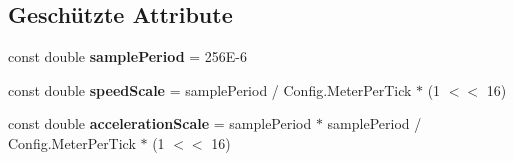 \subsection*{Geschützte Attribute}
\begin{DoxyCompactItemize}
\item 
\hypertarget{class_robot_ctrl_1_1_motor_ctrl___h_w_a9b2e8f281c704b73014ed11f838dfab5}{
const double {\bfseries samplePeriod} = 256E-\/6}
\label{class_robot_ctrl_1_1_motor_ctrl___h_w_a9b2e8f281c704b73014ed11f838dfab5}

\item 
\hypertarget{class_robot_ctrl_1_1_motor_ctrl___h_w_a054d80af56e02234681d2ad157be9376}{
const double {\bfseries speedScale} = samplePeriod / Config.MeterPerTick $\ast$ (1 $<$$<$ 16)}
\label{class_robot_ctrl_1_1_motor_ctrl___h_w_a054d80af56e02234681d2ad157be9376}

\item 
\hypertarget{class_robot_ctrl_1_1_motor_ctrl___h_w_aae79f545c62e3a7dbbd0efd6d434c68e}{
const double {\bfseries accelerationScale} = samplePeriod $\ast$ samplePeriod / Config.MeterPerTick $\ast$ (1 $<$$<$ 16)}
\label{class_robot_ctrl_1_1_motor_ctrl___h_w_aae79f545c62e3a7dbbd0efd6d434c68e}

\end{DoxyCompactItemize}
